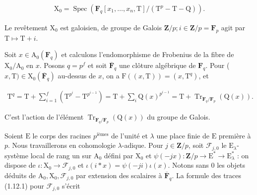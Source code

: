 \documentclass[10pt,leqno]{article}
\begin{document}
\begin{equation*}\begin{gathered}\mathrm{X}_{0} = \operatorname{Spec}(\mathbf{F}_{q}[x_{1},\ldots ,x_{n},\mathrm{T}]/(\mathrm{T}^{p}-\mathrm{T}-\mathrm{Q})).\end{gathered}\end{equation*}

\noindent Le revêtement \(\mathrm{X}_{0}\) est galoisien, de groupe de Galois \(\mathbf{Z}/p; i \in  \mathbf{Z}/p = \mathbf{F}_{p}\) agit par \(\mathrm{T} \longmapsto  \mathrm{T}+i\).\par

\noindent Soit \(x \in  \mathrm{A}_{0}(\mathbf{F}_{q})\) et calculons l'endomorphisme de Frobenius de la fibre de \(\mathrm{X}_{0}/\mathrm{A}_{0}\) en \(x\). Posons \(q = p^{f}\) et soit \(\overline{\mathbf{F}}_{q}\) une clôture algébrique de \(\mathbf{F}_{q}\). Pour (\(x,\mathrm{T}) \in  \mathrm{X}_{0}(\overline{\mathbf{F}}_{q})\) au-dessus de \(x\), on a \(\mathrm{F}((x,\mathrm{T})) = (x,\mathrm{T}^{q})\), et\par

\begin{equation*}\begin{gathered}\mathrm{T}^{q} = \mathrm{T} + \sum _{i=1}^{f} (\mathrm{T}^{p^{i}}-\mathrm{T}^{p^{i-1}}) = \mathrm{T} + \sum _{i} \mathrm{Q}(x)^{p^{i-1}} = \mathrm{T} + \operatorname{Tr}_{\mathbf{F}_{q}/\mathbf{F}_{p}}(\mathrm{Q}(x)).\end{gathered}\end{equation*}

\noindent C'est l'action de l'élément \(\operatorname{Tr}_{\mathbf{F}_{q}/\mathbf{F}_{p}}(\mathrm{Q}(x))\) du groupe de Galois.\par

\noindent Soient \(\mathrm{E}\) le corps des racines \(p^{\mathrm{ièmes}}\) de l'unité et \(\lambda \) une place finie de \(\mathrm{E}\) première à \(p\). Nous travaillerons en cohomologie \(\lambda \)-adique. Pour \(j \in  \mathbf{Z}/p\), soit \(\mathcal{F} _{j,0}\) le \(\mathrm{E}_{\lambda }\)-système local de rang un sur \(\mathrm{A}_{0}\) défini par \(\mathrm{X}_{0}\) et \(\psi (-jx) : \mathbf{Z}/p \longrightarrow  \mathrm{E}^{*} \longrightarrow  \mathrm{E}_{\lambda }^{*}\) : on dispose de \(\iota  : \mathrm{X}_{0} \longrightarrow  \mathcal{F} _{j,0}\) et \(\iota (i*x) = \psi (-ji)\iota (x)\). Notons sans 0 les objets déduits de \(\mathrm{A}_{0}, \mathrm{X}_{0}, \mathcal{F} _{j,0}\) par extension des scalaires à \(\overline{\mathbf{F}}_{q}\). La formule des traces (1.12.1) pour \(\mathcal{F} _{j,0}\) s'écrit\par
\end{document}
